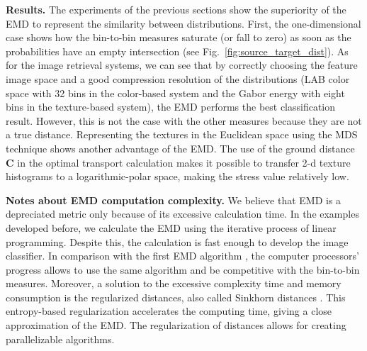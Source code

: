 \textbf{Results.}
The experiments of the previous sections show the superiority of the EMD to represent the similarity between distributions. First, the one-dimensional case shows how the bin-to-bin measures saturate (or fall to zero) as soon as the probabilities have an empty intersection (see Fig.\ \ref{fig:source_target_dist}). As for the image retrieval systems, we can see that by correctly choosing the feature image space and a good compression resolution of the distributions (LAB color space with 32 bins in the color-based system and the Gabor energy with eight bins in the texture-based system), the EMD performs the best classification result. However, this is not the case with the other measures because they are not a true distance. Representing the textures in the Euclidean space using the MDS technique shows another advantage of the EMD. The use of the ground distance $\textbf{C}$ in the optimal transport calculation makes it possible to transfer 2-d texture histograms to a logarithmic-polar space, making the stress value relatively low. 


\textbf{Notes about EMD computation complexity.}
We believe that EMD is a depreciated metric only because of its excessive calculation time. In the examples developed before, we calculate the EMD using the iterative process of linear programming. Despite this, the calculation is fast enough to develop the image classifier. In comparison with the first EMD algorithm \citep{Rubner.Tomasi.ea:IJCV:2000}, the computer processors' progress allows to use the same algorithm and be competitive with the bin-to-bin measures.
Moreover, a solution to the excessive complexity time and memory consumption is the regularized distances, also called Sinkhorn distances \citep{Cuturi:NIPS:2013}. This entropy-based regularization accelerates the computing time, giving a close approximation of the EMD. The regularization of distances allows for creating parallelizable algorithms.
